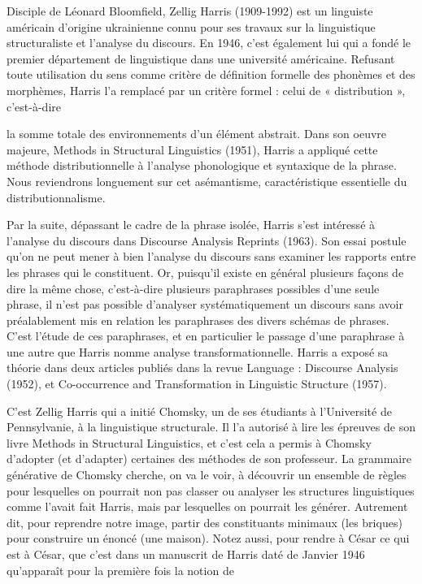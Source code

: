 Disciple de Léonard Bloomfield, Zellig Harris (1909-1992) est un linguiste américain d’origine ukrainienne connu pour ses travaux sur la linguistique structuraliste et l’analyse du discours. En 1946, c’est également lui qui a fondé le premier département de linguistique dans une université américaine. Refusant toute utilisation du sens comme critère de définition formelle des phonèmes et des morphèmes, Harris l’a remplacé par un critère formel : celui de « distribution », c’est-à-dire\par




la somme totale des environnements d’un élément abstrait. Dans son oeuvre majeure, Methods in Structural Linguistics (1951), Harris a appliqué cette méthode distributionnelle à l’analyse phonologique et syntaxique de la phrase. Nous reviendrons longuement sur cet asémantisme, caractéristique essentielle du distributionnalisme.\par


Par la suite, dépassant le cadre de la phrase isolée, Harris s’est intéressé à l’analyse du discours dans Discourse Analysis Reprints (1963). Son essai postule qu’on ne peut mener à bien l’analyse du discours sans examiner les rapports entre les phrases qui le constituent. Or, puisqu’il existe en général plusieurs façons de dire la même chose, c’est-à-dire plusieurs paraphrases possibles d’une seule phrase, il n’est pas possible d’analyser systématiquement un discours sans avoir préalablement mis en relation les paraphrases des divers schémas de phrases. C’est l’étude de ces paraphrases, et en particulier le passage d’une paraphrase à une autre que Harris nomme analyse transformationnelle. Harris a exposé sa théorie dans deux articles publiés dans la revue Language : Discourse Analysis (1952), et Co-occurrence and Transformation in Linguistic Structure (1957).\par


C’est Zellig Harris qui a initié Chomsky, un de ses étudiants à l’Université de Pennsylvanie, à la linguistique structurale. Il l’a autorisé à lire les épreuves de son livre Methods in Structural Linguistics, et c’est cela a permis à Chomsky d’adopter (et d’adapter) certaines des méthodes de son professeur. La grammaire générative de Chomsky cherche, on va le voir, à découvrir un ensemble de règles pour lesquelles on pourrait non pas classer ou analyser les structures linguistiques comme l’avait fait Harris, mais par lesquelles on pourrait les générer. Autrement dit, pour reprendre notre image, partir des constituants minimaux (les briques) pour construire un énoncé (une maison). Notez aussi, pour rendre à César ce qui est à César, que c’est dans un manuscrit de Harris daté de Janvier 1946 qu’apparaît pour la première fois la notion de\par

